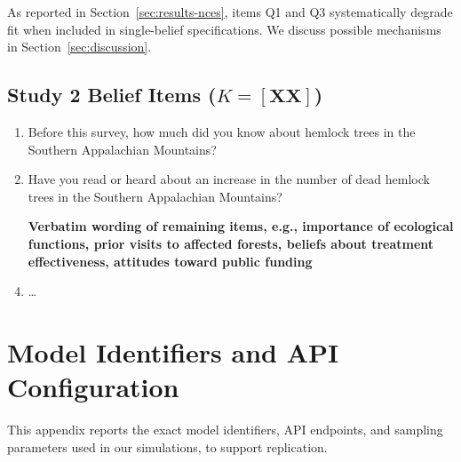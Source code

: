\documentclass[12pt]{article}
\begin{document}
\noindent As reported in Section~\ref{sec:results-nces}, items Q1 and Q3 systematically degrade fit when included in single-belief specifications. We discuss possible mechanisms in Section~\ref{sec:discussion}.

\subsection{Study 2 Belief Items ($K = [\textbf{XX}]$)}

\begin{enumerate}[label=Q\arabic*., leftmargin=*]
    \item Before this survey, how much did you know about hemlock trees in the Southern Appalachian Mountains?
    \item Have you read or heard about an increase in the number of dead hemlock trees in the Southern Appalachian Mountains?
    \item [\textbf{Verbatim wording of remaining items, e.g., importance of ecological functions, prior visits to affected forests, beliefs about treatment effectiveness, attitudes toward public funding}]
    \item \dots
\end{enumerate}

\section{Model Identifiers and API Configuration}\label{app:model-ids}

This appendix reports the exact model identifiers, API endpoints, and sampling parameters used in our simulations, to support replication.
\end{document}
